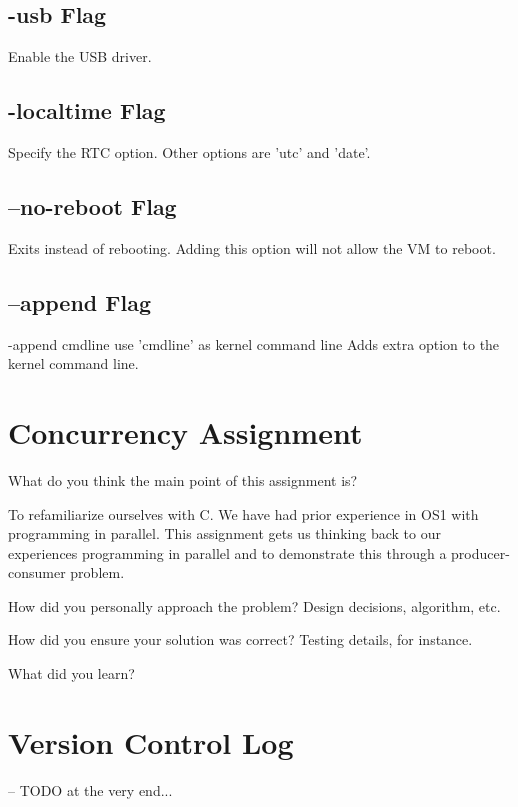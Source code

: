 \documentclass{article}
\newenvironment{question}[2][Question]	{\begin{trivlist}
\item[\hskip \labelsep {\bfseries #1}\hskip \labelsep {\bfseries #2.}]}
{\end{trivlist}} %
\begin{document}
\subsection{-usb Flag}
Enable the USB driver.

\subsection{-localtime Flag}
Specify the RTC option. Other options are 'utc' and 'date'.

\subsection{--no-reboot Flag}
Exits instead of rebooting. Adding this option will not allow the VM to reboot.

\subsection{--append Flag}
-append cmdline use 'cmdline' as kernel command line
Adds extra option to the kernel command line.


\section{Concurrency Assignment}
\begin{question}{1}
What do you think the main point of this assignment is?
\end{question}

To refamiliarize ourselves with C. We have had prior experience in OS1 with programming in parallel. This assignment gets us thinking back to our experiences programming in parallel and to demonstrate this through a producer-consumer problem.

\begin{question}{2}
How did you personally approach the problem? Design decisions, algorithm, etc.
\end{question}

\begin{question}{3}
How did you ensure your solution was correct? Testing details, for instance.
\end{question}

\begin{question}{4}
What did you learn?
\end{question}

\section{Version Control Log}
-- TODO at the very end...
\end{document}
